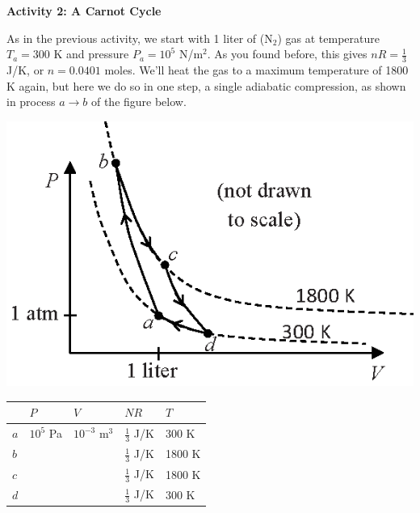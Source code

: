 \vspace{0.3in}

\pagebreak
\textbf{Activity 2: A Carnot Cycle}

As in the previous activity, we start with 1 liter of ($\textrm{N}_2$) gas at temperature $T_a = 300$ K and pressure $P_a = 10^5$ N/m$^2$.   As you found before, this gives $nR=\frac{1}{3}$ J/K, or $n=0.0401$ moles.  We'll heat the gas to a maximum temperature of 1800 K again, but here we do so in one step, a single adiabatic compression, as shown in process $a \rightarrow b$ of the figure below.

\begin{minipage}{0.44\textwidth}
\includegraphics[width=1.0\textwidth]{ideal_gas_cycles/carnot_cycle.eps}
\end{minipage}
\begin{minipage}{0.54\textwidth}
\vspace{0.1 in}
\renewcommand{\arraystretch}{2.0}
\begin{tabular}{| C{0.3in} | C{0.6in} | C{0.6in} | C{0.6in} | C{0.6in} |}
\hline
& $P$ & $V$ & $NR$ & $T$ \\ \hline
$a$ & $10^5$ Pa & $10^{-3}$ m$^3$ & $\frac{1}{3}$ J/K & 300 K \\ \hline
$b$ &                  &                            & $\frac{1}{3}$ J/K & 1800 K \\ \hline
$c$ &                  &                            & $\frac{1}{3}$ J/K & 1800 K \\ \hline
$d$ &                  &                            & $\frac{1}{3}$ J/K & 300 K \\ \hline
\end{tabular}
\renewcommand{\arraystretch}{1.0}
\end{minipage}

